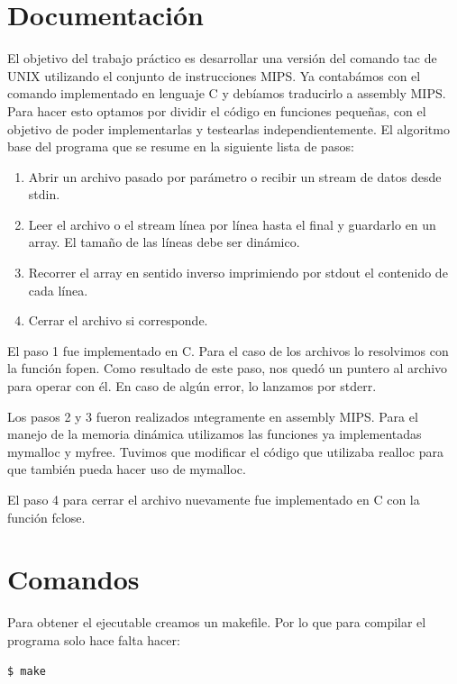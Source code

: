 \documentclass[a4paper,11pt]{article}
\begin{document}
\section{Documentaci\'on}
El objetivo del trabajo pr\'actico es desarrollar una versi\'on del comando tac de UNIX utilizando el conjunto de instrucciones MIPS. 
Ya contab\'amos con el comando implementado en lenguaje C y deb\'iamos traducirlo a assembly MIPS. Para hacer esto optamos por dividir el c\'odigo en funciones pequeñas, con el objetivo de poder implementarlas y testearlas independientemente.
El algoritmo base del programa que se resume en la siguiente lista de pasos:
\begin{enumerate}
	\item Abrir un archivo pasado por par\'ametro o recibir un stream de datos desde stdin.
	\item Leer el archivo o el stream l\'inea por l\'inea hasta el final y guardarlo en un array. El tama\~no de las l\'ineas debe ser din\'amico.
	\item Recorrer el array en sentido inverso imprimiendo por stdout el contenido de cada l\'inea.
	\item Cerrar el archivo si corresponde.
\end{enumerate}

El paso 1 fue implementado en C. Para el caso de los archivos lo resolvimos con la funci\'on fopen. Como resultado de este paso, nos qued\'o un puntero al archivo para operar con \'el. En caso de alg\'un error, lo lanzamos por stderr.

Los pasos 2 y 3 fueron realizados ıntegramente en assembly MIPS. Para el manejo de la memoria din\'amica utilizamos las funciones ya implementadas mymalloc y myfree. Tuvimos que modificar el c\'odigo que utilizaba realloc para que tambi\'en pueda hacer uso de mymalloc.

El paso 4 para cerrar el archivo nuevamente fue implementado en C con la funci\'on fclose. 


\section{Comandos}
Para obtener el ejecutable creamos un makefile. Por lo que para compilar el programa solo hace falta hacer:

\lstset{language=bash, breaklines=true, basicstyle=\normalsize}
\begin{lstlisting}
$ make
\end{lstlisting}
\end{document}
